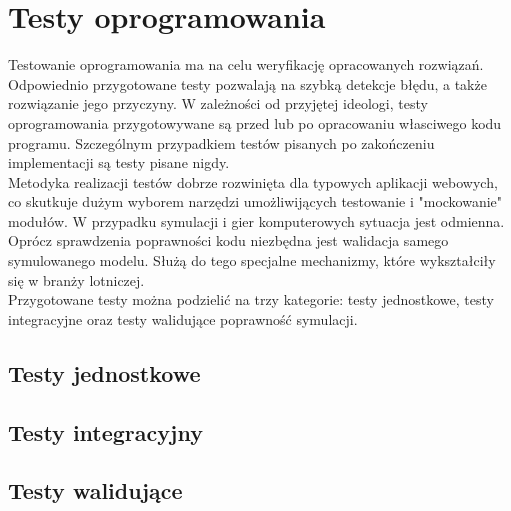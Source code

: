 \documentclass[15pt]{sprawozdanie}
\begin{document}
\begin{table}[!h]
\caption{Analiza SWOT}
\label{swot}
\end{table}

\newpage
\section{Testy oprogramowania}

Testowanie oprogramowania ma na celu weryfikację opracowanych rozwiązań. Odpowiednio przygotowane testy pozwalają na szybką detekcje błędu, a także rozwiązanie jego przyczyny. W zależności od przyjętej ideologi, testy oprogramowania przygotowywane są przed lub po opracowaniu własciwego kodu programu. Szczególnym przypadkiem testów pisanych po zakończeniu implementacji są testy pisane nigdy.\\

Metodyka realizacji testów dobrze rozwinięta dla typowych aplikacji webowych, co skutkuje dużym wyborem narzędzi umożliwijących testowanie i "mockowanie" modułów. W przypadku symulacji i gier komputerowych sytuacja jest odmienna. Oprócz sprawdzenia poprawności kodu niezbędna jest walidacja samego symulowanego modelu. Służą do tego specjalne mechanizmy, które wykształciły się w branży lotniczej.\\

Przygotowane testy można podzielić na trzy kategorie: testy jednostkowe, testy integracyjne oraz testy walidujące poprawność symulacji.

\subsection{Testy jednostkowe}

\subsection{Testy integracyjny}

\subsection{Testy walidujące}
\end{document}
